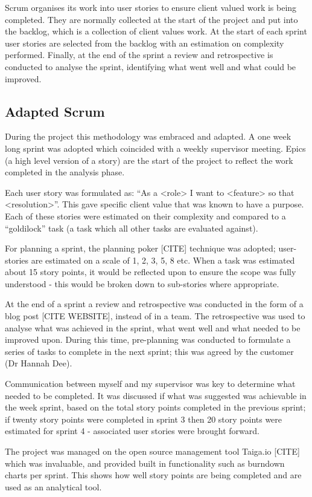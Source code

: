 Scrum organises its work into user stories to ensure client valued work is being completed. They are normally collected at the start of the project and put into the backlog, which is a collection of client values work. At the start of each sprint user stories are selected from the backlog with an estimation on complexity performed. Finally, at the end of the sprint a review and retrospective is conducted to analyse the sprint, identifying what went well and what could be improved.

\subsection{Adapted Scrum}
During the project this methodology was embraced and adapted. A one week long sprint was adopted which coincided with a weekly supervisor meeting. Epics (a high level version of a story) are the start of the project to reflect the work completed in the analysis phase.

Each user story was formulated as: ``As a <role> I want to <feature> so that <resolution>''. This gave specific client value that was known to have a purpose. Each of these stories were estimated on their complexity and compared to a ``goldilock'' task (a task which all other tasks are evaluated against).

For planning a sprint, the planning poker [CITE] technique was adopted; user-stories are estimated on a scale of 1, 2, 3, 5, 8 etc. When a task was estimated about 15 story points, it would be reflected upon to ensure the scope was fully understood - this would be broken down to sub-stories where appropriate.

At the end of a sprint a review and retrospective was conducted in the form of a blog post [CITE WEBSITE], instead of in a team. The retrospective was used to analyse what was achieved in the sprint, what went well and what needed to be improved upon. During this time, pre-planning was conducted to formulate a series of tasks to complete in the next sprint; this was agreed by the customer (Dr Hannah Dee).

Communication between myself and my supervisor was key to determine what needed to be completed. It was discussed if what was suggested was achievable in the week sprint, based on the total story points completed in the previous sprint; if twenty story points were completed in sprint 3 then 20 story points were estimated for sprint 4 - associated user stories were brought forward.

The project was managed on the open source management tool Taiga.io [CITE] which was invaluable, and provided built in functionality such as burndown charts per sprint. This shows how well story points are being completed and are used as an analytical tool.

